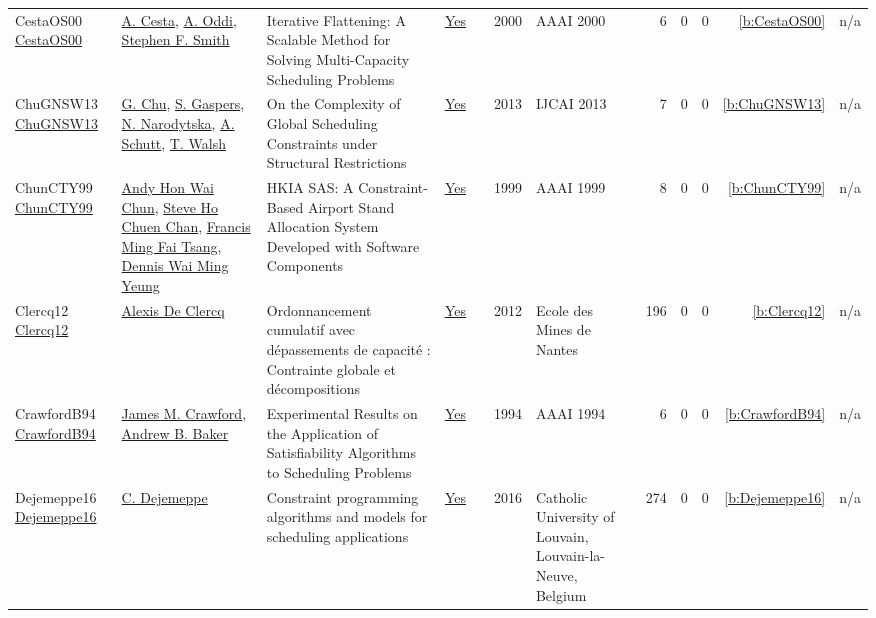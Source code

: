 {\begin{longtable}{>{\raggedright\arraybackslash}p{3cm}>{\raggedright\arraybackslash}p{6cm}>{\raggedright\arraybackslash}p{6.5cm}rrrp{2.5cm}rrrrr}
CestaOS00 \href{http://www.aaai.org/Library/AAAI/2000/aaai00-114.php}{CestaOS00} & \hyperref[auth:a286]{A. Cesta}, \hyperref[auth:a284]{A. Oddi}, \hyperref[auth:a300]{Stephen F. Smith} & Iterative Flattening: {A} Scalable Method for Solving Multi-Capacity Scheduling Problems & \href{../works/CestaOS00.pdf}{Yes} & \cite{CestaOS00} & 2000 & AAAI 2000 & 6 & 0 & 0 & \ref{b:CestaOS00} & n/a\\
ChuGNSW13 \href{http://www.aaai.org/ocs/index.php/IJCAI/IJCAI13/paper/view/6878}{ChuGNSW13} & \hyperref[auth:a346]{G. Chu}, \hyperref[auth:a799]{S. Gaspers}, \hyperref[auth:a800]{N. Narodytska}, \hyperref[auth:a125]{A. Schutt}, \hyperref[auth:a278]{T. Walsh} & On the Complexity of Global Scheduling Constraints under Structural Restrictions & \href{../works/ChuGNSW13.pdf}{Yes} & \cite{ChuGNSW13} & 2013 & IJCAI 2013 & 7 & 0 & 0 & \ref{b:ChuGNSW13} & n/a\\
ChunCTY99 \href{http://www.aaai.org/Library/IAAI/1999/iaai99-111.php}{ChunCTY99} & \hyperref[auth:a1346]{Andy Hon Wai Chun}, \hyperref[auth:a1347]{Steve Ho Chuen Chan}, \hyperref[auth:a1348]{Francis Ming Fai Tsang}, \hyperref[auth:a1349]{Dennis Wai Ming Yeung} & {HKIA} {SAS:} {A} Constraint-Based Airport Stand Allocation System Developed with Software Components & \href{../works/ChunCTY99.pdf}{Yes} & \cite{ChunCTY99} & 1999 & AAAI 1999 & 8 & 0 & 0 & \ref{b:ChunCTY99} & n/a\\
Clercq12 \href{https://theses.hal.science/tel-00794323}{Clercq12} & \hyperref[auth:a248]{Alexis De Clercq} & {Ordonnancement cumulatif avec d{\'e}passements de capacit{\'e} : Contrainte globale et d{\'e}compositions} & \href{../works/Clercq12.pdf}{Yes} & \cite{Clercq12} & 2012 & {Ecole des Mines de Nantes} & 196 & 0 & 0 & \ref{b:Clercq12} & n/a\\
CrawfordB94 \href{http://www.aaai.org/Library/AAAI/1994/aaai94-168.php}{CrawfordB94} & \hyperref[auth:a1301]{James M. Crawford}, \hyperref[auth:a1302]{Andrew B. Baker} & Experimental Results on the Application of Satisfiability Algorithms to Scheduling Problems & \href{../works/CrawfordB94.pdf}{Yes} & \cite{CrawfordB94} & 1994 & AAAI 1994 & 6 & 0 & 0 & \ref{b:CrawfordB94} & n/a\\
Dejemeppe16 \href{https://hdl.handle.net/2078.1/178078}{Dejemeppe16} & \hyperref[auth:a207]{C. Dejemeppe} & Constraint programming algorithms and models for scheduling applications & \href{../works/Dejemeppe16.pdf}{Yes} & \cite{Dejemeppe16} & 2016 & Catholic University of Louvain, Louvain-la-Neuve, Belgium & 274 & 0 & 0 & \ref{b:Dejemeppe16} & n/a\\

\end{longtable}}
